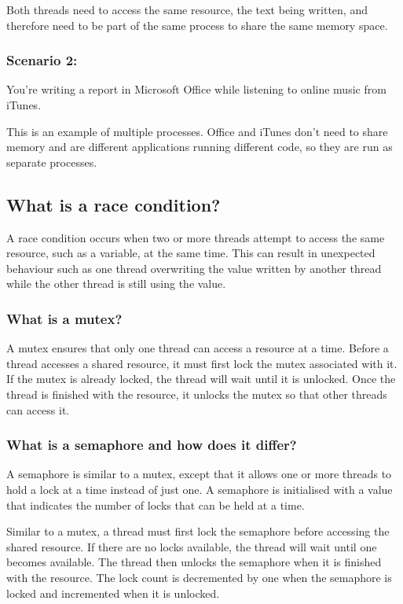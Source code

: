 \documentclass{article}
\begin{document}
    Both threads need to access the same resource, the text being written, and therefore
    need to be part of the same process to share the same memory space.

    \subsubsection{Scenario 2:}
    You're writing a report in Microsoft Office while listening to online music from
    iTunes.

    This is an example of multiple processes. Office and iTunes don't need to share
    memory and are different applications running different code, so they are run as
    separate processes.


\subsection{What is a race condition?}
A race condition occurs when two or more threads attempt to access the same resource,
such as a variable, at the same time. This can result in unexpected behaviour such as
one thread overwriting the value written by another thread while the other thread is
still using the value.

    \subsubsection{What is a mutex?}
    A mutex ensures that only one thread can access a resource at a time.
    Before a thread accesses a shared resource, it must first lock the mutex associated with it.
    If the mutex is already locked, the thread will wait until it is unlocked.
    Once the thread is finished with the resource, it unlocks the mutex so that other
    threads can access it.

    \subsubsection{What is a semaphore and how does it differ?}
    A semaphore is similar to a mutex, except that it allows one or more threads to hold
    a lock at a time instead of just one. A semaphore is initialised with a value
    that indicates the number of locks that can be held at a time.

    Similar to a mutex, a thread must first lock the semaphore before accessing the shared resource.
    If there are no locks available, the thread will wait until one becomes available.
    The thread then unlocks the semaphore when it is finished with the resource.
    The lock count is decremented by one when the semaphore is locked and incremented
    when it is unlocked.
\end{document}

